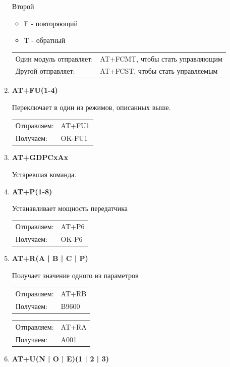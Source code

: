 \documentclass[bibliography=totocnumbered]{scrartcl}
\begin{document}
\begin{enumerate}
Второй
\begin{itemize}
\item F - повторяющий
\item T - обратный
\end{itemize}

\begin{tabular}{ l l }
  Один модуль отправляет: & AT+FCMT, чтобы стать управляющим \\
  Другой отправляет: & AT+FCST, чтобы стать управляемым \\
\end{tabular}


\item \textbf{AT+FU(1-4)}

Переключает в один из режимов, описанных выше.

\begin{tabular}{ l l }
  Отправляем: & AT+FU1 \\
  Получаем: & OK-FU1 \\
\end{tabular}


\item \textbf{AT+GDPCxAx}

Устаревшая команда.
  
\item \textbf{AT+P(1-8)}

Устанавливает мощность передатчика

\begin{tabular}{ l l }
  Отправляем: & AT+P6 \\
  Получаем: & OK-P6 \\
\end{tabular}

  
\item \textbf{AT+R(A | B | C | P)}

Получает значение одного из параметров

\begin{tabular}{ l l }
  Отправляем: & AT+RB \\
  Получаем: & B9600 \\
\end{tabular}

\begin{tabular}{ l l }
  Отправляем: & AT+RA \\
  Получаем: & A001 \\
\end{tabular}


\item \textbf{AT+U(N | O | E)(1 | 2 | 3)}


\end{enumerate}
\end{document}
